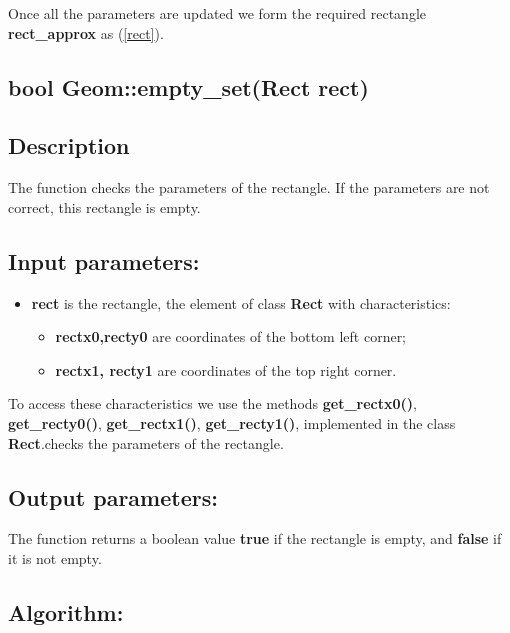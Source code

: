 \documentclass{report}
\begin{document}
Once all the parameters are updated we form the required rectangle {\bfseries rect\_approx} as (\ref{rect}).


\label{Empty}
\begin{center} 
	\section*{\bfseries bool Geom::empty\_set(Rect rect)}
\end{center} 

\subsection*{Description}

The function checks the parameters of the rectangle. If the parameters are not correct, this rectangle is empty. 

\subsection*{Input parameters:}

\begin{itemize}
	\item {\bfseries	rect} is the rectangle, the element of class {\bfseries Rect} with characteristics:
	
	\begin{itemize}
		\item {\bfseries rectx0,recty0} are coordinates of the bottom left corner;
		\item {\bfseries rectx1, recty1} are coordinates of the top right corner.
	\end{itemize}
\end{itemize}

To access these characteristics we use the methods  {\bfseries get\_rectx0()}, {\bfseries get\_recty0()}, {\bfseries get\_rectx1()}, {\bfseries get\_recty1()}, implemented in the class {\bfseries Rect}.checks the parameters  of the rectangle.

\subsection*{Output parameters:}

The function returns a boolean value {\bfseries true} if the rectangle is empty, and {\bfseries false} if it is not empty.

\subsection*{Algorithm:}
\end{document}
